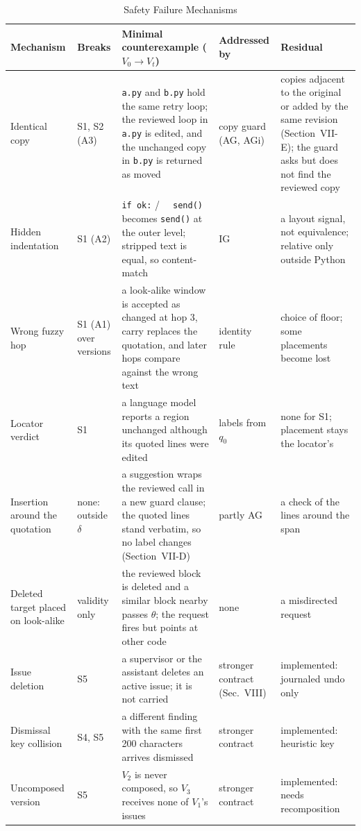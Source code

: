 \documentclass[10pt,conference,letterpaper]{IEEEtran}
\newcommand{\lbl}[1]{\textsf{#1}}
\begin{document}
\begin{table}[!t]
\caption{Safety Failure Mechanisms}\label{tab:failure-mechanisms}
\centering\footnotesize
\setlength{\tabcolsep}{3pt}
\begin{tabular}{@{}L{.13\textwidth}L{.07\textwidth}L{.37\textwidth}L{.14\textwidth}L{.24\textwidth}@{}}\toprule
Mechanism & Breaks & Minimal counterexample ($V_0\rightarrow V_t$) & Addressed by & Residual \\ \midrule
Identical copy & S1, S2 (A3) & \texttt{a.py} and \texttt{b.py} hold the same retry loop; the reviewed loop in \texttt{a.py} is edited, and the unchanged copy in \texttt{b.py} is returned as \lbl{moved} & copy guard (AG, AGi) & copies adjacent to the original or added by the same revision (Section~VII-E); the guard asks but does not find the reviewed copy \\
Hidden indentation & S1 (A2) & \texttt{if ok:} / \texttt{\ \ send()} becomes \texttt{send()} at the outer level; stripped text is equal, so \lbl{content-match} & IG & a layout signal, not equivalence; relative only outside Python \\
Wrong fuzzy hop & S1 (A1) over versions & a look-alike window is accepted as \lbl{changed} at hop 3, carry replaces the quotation, and later hops compare against the wrong text & identity rule & choice of floor; some placements become lost \\
Locator verdict & S1 & a language model reports a region unchanged although its quoted lines were edited & labels from $q_0$ & none for S1; placement stays the locator's \\
Insertion around the quotation & none: outside $\delta$ & a suggestion wraps the reviewed call in a new guard clause; the quoted lines stand verbatim, so no label changes (Section~VII-D) & partly AG & a check of the lines around the span \\
Deleted target placed on look-alike & validity only & the reviewed block is deleted and a similar block nearby passes $\theta$; the request fires but points at other code & none & a misdirected request \\
Issue deletion & S5 & a supervisor or the assistant deletes an active issue; it is not carried & stronger contract (Sec.~VIII) & implemented: journaled undo only \\
Dismissal key collision & S4, S5 & a different finding with the same first 200 characters arrives \lbl{dismissed} & stronger contract & implemented: heuristic key \\
Uncomposed version & S5 & $V_2$ is never composed, so $V_3$ receives none of $V_1$'s issues & stronger contract & implemented: needs recomposition \\ \bottomrule
\end{tabular}
\end{table}
\end{document}
